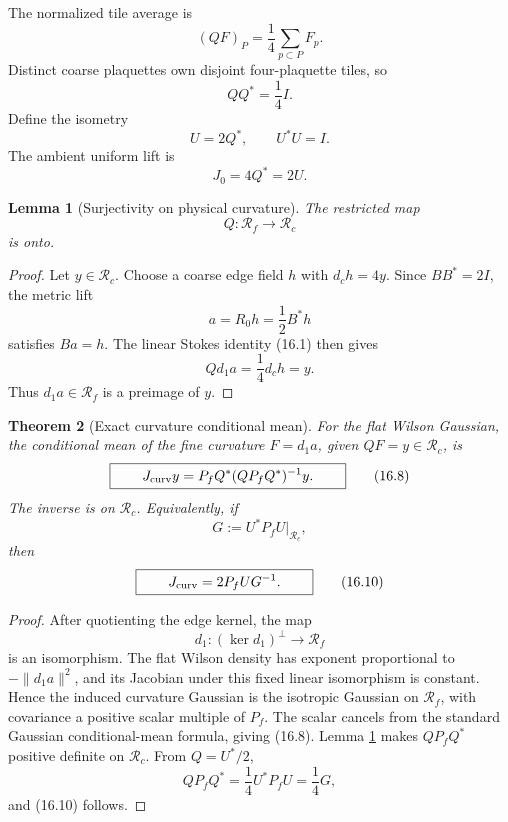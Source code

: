 \documentclass[11pt,oneside]{book}
\newtheorem{theorem}{Theorem}[chapter]
\newtheorem{lemma}[theorem]{Lemma}
\theoremstyle{definition}
\theoremstyle{remark}
\begin{document}
The normalized tile average is
\[
 (QF)_P=\frac14\sum_{p\subset P}F_p.                               \tag{16.4}
\]
Distinct coarse plaquettes own disjoint four-plaquette tiles, so
\[
                     QQ^*=\frac14I.                               \tag{16.5}
\]
Define the isometry
\[
                         U=2Q^*,\qquad U^*U=I.                     \tag{16.6}
\]
The ambient uniform lift is
\[
                         J_0=4Q^*=2U.                              \tag{16.7}
\]

\begin{lemma}[Surjectivity on physical curvature]
\label{lem:e8v16-surjective}
The restricted map
\[
                  Q:\mathcal R_f\longrightarrow\mathcal R_c
\]
is onto.
\end{lemma}

\begin{proof}
Let \(y\in\mathcal R_c\).  Choose a coarse edge field \(h\) with
\(d_ch=4y\).  Since \(BB^*=2I\), the metric lift
\[
                         a=R_0h=\frac12B^*h
\]
satisfies \(Ba=h\).  The linear Stokes identity (16.1) then gives
\[
                         Qd_1a=\frac14d_ch=y.
\]
Thus \(d_1a\in\mathcal R_f\) is a preimage of \(y\).
\end{proof}

\begin{theorem}[Exact curvature conditional mean]
\label{thm:e8v16-conditional}
For the flat Wilson Gaussian, the conditional mean of the fine
curvature \(F=d_1a\), given \(QF=y\in\mathcal R_c\), is
\[
\boxed{\qquad
 J_{\rm curv}y
 =P_fQ^*(QP_fQ^*)^{-1}y.
\qquad}                                                           \tag{16.8}
\]
The inverse is on \(\mathcal R_c\).  Equivalently, if
\[
                         G:=U^*P_fU\big|_{\mathcal R_c},             \tag{16.9}
\]
then
\[
\boxed{\qquad
 J_{\rm curv}=2P_fUG^{-1}.
\qquad}                                                           \tag{16.10}
\]
\end{theorem}

\begin{proof}
After quotienting the edge kernel, the map
\[
 d_1:(\ker d_1)^\perp\longrightarrow\mathcal R_f
\]
is an isomorphism.  The flat Wilson density has exponent proportional
to \(-\|d_1a\|^2\), and its Jacobian under this fixed linear
isomorphism is constant.  Hence the induced curvature Gaussian is the
isotropic Gaussian on \(\mathcal R_f\), with covariance a positive
scalar multiple of \(P_f\).  The scalar cancels from the standard
Gaussian conditional-mean formula, giving (16.8).  Lemma
\ref{lem:e8v16-surjective} makes \(QP_fQ^*\) positive definite on
\(\mathcal R_c\).  From \(Q=U^*/2\),
\[
 QP_fQ^*=\frac14U^*P_fU=\frac14G,
\]
and (16.10) follows.
\end{proof}
\end{document}
